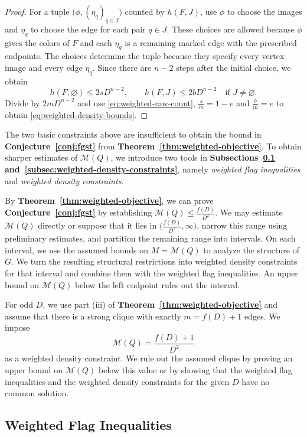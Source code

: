 \documentclass[preprint,11pt,numbers]{elsarticle-arxiv}
\numberwithin{equation}{section}
\theoremstyle{definition}
\begin{document}
\begin{proof}
For a tuple $\bigl(\phi,(\eta_q)_{q\in J}\bigr)$ counted by $h(F,J)$,
use $\phi$ to choose the images and $\eta_q$ to choose the edge for
each pair $q\in J$. These choices are allowed because $\phi$ gives
the colors of $F$ and each $\eta_q$ is a remaining marked edge with
the prescribed endpoints. The choices determine the tuple because
they specify every vertex image and every edge $\eta_q$.
Since there are $n-2$ steps after the initial choice, we obtain
\[
 h(F,\varnothing)\leq2sD^{n-2},\qquad
 h(F,J)\leq2bD^{n-2}\quad\text{if }J\ne\varnothing .
\]
Divide by $2mD^{n-2}$ and use \eqref{eq:weighted-raw-count},
$\frac{s}{m}=1-e$ and $\frac{b}{m}=e$ to obtain
\eqref{eq:weighted-density-bounds}.
\end{proof}

The two basic constraints above are insufficient to obtain the bound
in \textbf{Conjecture~\ref{conj:fgst}} from
\textbf{Theorem~\ref{thm:weighted-objective}}. To obtain sharper
estimates of $\mathcal M(Q)$, we introduce two tools in
\textbf{Subsections~\ref{subsec:weighted-flag-inequalities}
and~\ref{subsec:weighted-density-constraints}}, namely
\emph{weighted flag inequalities} and \emph{weighted density constraints}.

By \textbf{Theorem~\ref{thm:weighted-objective}}, we can prove
\textbf{Conjecture~\ref{conj:fgst}} by establishing
$\mathcal M(Q)\leq\frac{f(D)}{D^2}$. We may estimate $\mathcal M(Q)$
directly or suppose that it lies in $\bigl(\frac{f(D)}{D^2},\infty\bigr)$,
narrow this range using preliminary estimates, and partition the
remaining range into intervals. On each interval, we use the assumed
bounds on $M=\mathcal M(Q)$ to analyze the structure of $G$. We turn
the resulting structural restrictions into weighted density constraints
for that interval and combine them with the weighted flag inequalities.
An upper bound on $\mathcal M(Q)$ below the left endpoint rules out
the interval.

For odd $D$, we use part \textup{(iii)} of
\textbf{Theorem~\ref{thm:weighted-objective}} and assume that there is
a strong clique with exactly $m=f(D)+1$ edges. We impose
\[
 \mathcal M(Q)=\frac{f(D)+1}{D^2}
\]
as a weighted density constraint. We rule out the assumed clique by
proving an upper bound on $\mathcal M(Q)$ below this value or by
showing that the weighted flag inequalities and the weighted density
constraints for the given $D$ have no common solution.

\subsection{Weighted Flag Inequalities}\label{subsec:weighted-flag-inequalities}
\end{document}
